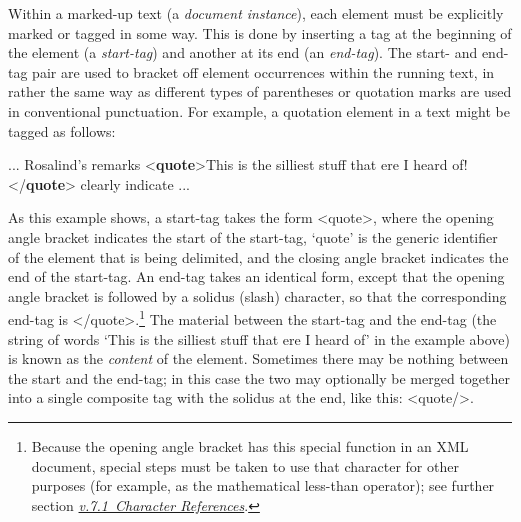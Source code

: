 Within a marked-up text (a \textit{document instance}), each element must be explicitly marked or tagged in some way. This is done by inserting a tag at the beginning of the element (a \textit{start-tag}) and another at its end (an \textit{end-tag}). The start- and end-tag pair are used to bracket off element occurrences within the running text, in rather the same way as different types of parentheses or quotation marks are used in conventional punctuation. For example, a quotation element in a text might be tagged as follows: \par\bgroup{}\exampleFont \begin{shaded}\noindent\mbox{}... Rosalind's\mbox{}\newline 
 remarks {<\textbf{quote}>}This is the silliest stuff that ere I heard\mbox{}\newline 
 of!{</\textbf{quote}>} clearly indicate ...\end{shaded}\egroup\par \noindent  As this example shows, a start-tag takes the form <quote>, where the opening angle bracket indicates the start of the start-tag, ‘quote’ is the generic identifier of the element that is being delimited, and the closing angle bracket indicates the end of the start-tag. An end-tag takes an identical form, except that the opening angle bracket is followed by a solidus (slash) character, so that the corresponding end-tag is </quote>.\footnote{Because the opening angle bracket has this special function in an XML document, special steps must be taken to use that character for other purposes (for example, as the mathematical less-than operator); see further section \textit{\hyperref[SG-er]{v.7.1\ Character References}}.} The material between the start-tag and the end-tag (the string of words ‘This is the silliest stuff that ere I heard of’ in the example above) is known as the \textit{content} of the element. Sometimes there may be nothing between the start and the end-tag; in this case the two may optionally be merged together into a single composite tag with the solidus at the end, like this: <quote/>.
